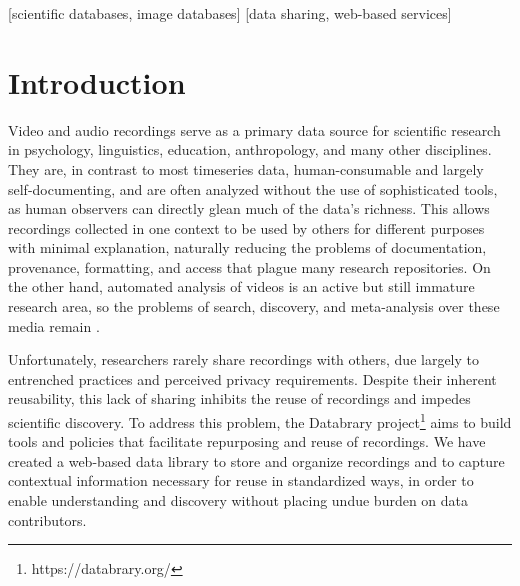 \documentclass{sig-alternate}
\begin{document}
[scientific databases, image databases]
[data sharing, web-based services]



\section{Introduction}

Video and audio recordings serve as a primary data source for scientific research in psychology, linguistics, education, anthropology, and many other disciplines.
They are, in contrast to most timeseries data, human-consumable and largely self-documenting, and are often analyzed without the use of sophisticated tools, as human observers can directly glean much of the data's richness.
This allows recordings collected in one context to be used by others for different purposes with minimal explanation, naturally reducing the problems of documentation, provenance, formatting, and access that plague many research repositories.
On the other hand, automated analysis of videos is an active but still immature research area, so the problems of search, discovery, and meta-analysis over these media remain \cite{Albertson_2013, Lanagan_Smeaton_2012}.

Unfortunately, researchers rarely share recordings with others, due largely to entrenched practices and perceived privacy requirements.
Despite their inherent reusability, this lack of sharing inhibits the reuse of recordings and impedes scientific discovery.
To address this problem, the Databrary project\footnote{https://databrary.org/} aims to build tools and policies that facilitate repurposing and reuse of recordings.
We have created a web-based data library to store and organize recordings and to capture contextual information necessary for reuse in standardized ways, in order to enable understanding and discovery without placing undue burden on data contributors.
\end{document}
